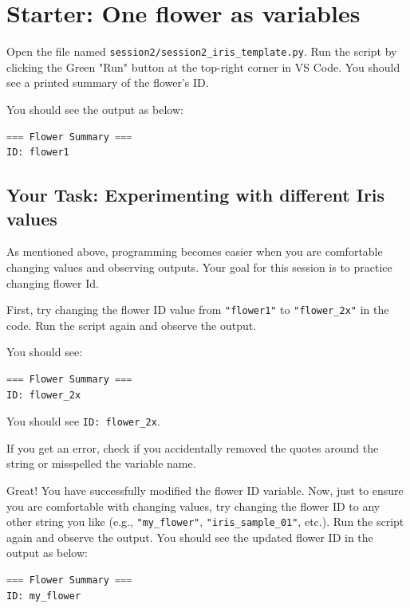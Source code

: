 \section{Starter: One flower as variables}

\noindent
Open the file named \texttt{session2/session2\_iris\_template.py}. 
Run the script by clicking the Green "Run" button at the top-right corner in VS Code. You should see a printed summary of the flower's ID.

You should see the output as below:
\begin{lstlisting}[language=Python]
=== Flower Summary ===
ID: flower1
\end{lstlisting}

\subsection{Your Task: Experimenting with different Iris values}

As mentioned above, programming becomes easier when you are comfortable changing values and observing outputs.
Your goal for this session is to practice changing flower Id.

First, try changing the flower ID value from \texttt{"flower1"} to \texttt{"flower\_2x"} in the code.
Run the script again and observe the output.

You should see:
\begin{lstlisting}[language=Python]
=== Flower Summary ===
ID: flower_2x
\end{lstlisting}

\begin{tcolorbox}[title=Checkpoint]
You should see \texttt{ID: flower\_2x}.
\end{tcolorbox}
\begin{tcolorbox}[title=Common Mistakes]
If you get an error, check if you accidentally removed the quotes around the string or misspelled the variable name.
\end{tcolorbox}

Great! You have successfully modified the flower ID variable.
Now, just to ensure you are comfortable with changing values, try changing the flower ID to any other string you like (e.g., \texttt{"my\_flower"}, \texttt{"iris\_sample\_01"}, etc.).
Run the script again and observe the output.
You should see the updated flower ID in the output as below:
\begin{lstlisting}[language=Python]
=== Flower Summary ===
ID: my_flower
\end{lstlisting}

